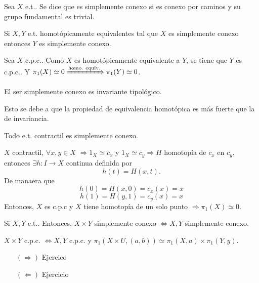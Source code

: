 \begin{defn}
  Sea $X$ e.t.. Se dice que es simplemente conexo si es conexo por caminos y su grupo fundamental es trivial.
\end{defn}

\begin{prop}
  Si $X,Y$ e.t. homotópicamente equivalentes tal que $X$ es simplemente conexo entonces $Y$ es simplemente conexo.
\end{prop}

\begin{dem}
  Sea $X$ c.p.c.. Como $X$ es homotópicamente equivalente a $Y$, se tiene que $Y$ es c.p.c.. Y $\pi_{1}(X) \simeq 0 \xRightarrow[]{ \text{homo. equiv.} } \pi_{1}(Y) \simeq 0$.
\end{dem}

\begin{cor}
  El ser simplemente conexo es invariante tipológico.
\end{cor}

\begin{dem}
  Esto se debe a que la propiedad de equivalencia homotópica es más fuerte que la de invariancia.
\end{dem}

\begin{prop}
  Todo e.t. contractil es simplemente conexo.
\end{prop}

\begin{dem}
  $X$ contractil, $\forall x, y \in X$ $\Rightarrow 1_{X} \simeq c_{x}$ y $1_{X} \simeq c_{y} \Rightarrow H$ homotopía de $c_{x}$ en $c_{y}$, entonces $\exists h : I \to X$ continua definida por 
  \[ 
    h(t) = H(x,t).
  \]  
  De manaera que
  \[ 
    h(0) = H(x,0) = c_{x}(x) = x 
  \] 
  \[ 
    h(1) = H(y, 1) = c_{y}(x) = x
  \] 
  Entonces, $X$ es c.p.c y $X$ tiene homotopía de un solo punto $\Rightarrow \pi_{1}(X) \simeq 0$.
\end{dem}

\begin{prop}
  Si $X, Y$ e.t.. Entonces, $X \times Y$ simplemente conexo $\Leftrightarrow X, Y$ simplemente conexo.
\end{prop}

\begin{dem}
  $X \times Y$ c.p.c. $\Leftrightarrow X, Y$ c.p.c. y $\pi_{1}(X \times U, (a, b)) \simeq \pi_{1}(X,a) \times \pi_{1}(Y, y)$.
  \begin{enumerate}[label=(\roman*)]
    \item [$(\Rightarrow)$] Ejercico
    \item [$(\Leftarrow)$] Ejercicio
  \end{enumerate}
\end{dem}

